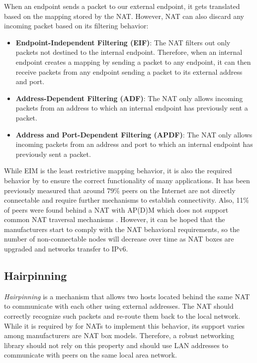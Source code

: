 When an endpoint sends a packet to our external endpoint, it gets translated based on the mapping stored by the NAT. However, NAT can also discard any incoming packet based on its filtering behavior:

\begin{itemize}
    \item \textbf{Endpoint-Independent Filtering (EIF)}: The NAT filters out only packets not destined to the internal endpoint. Therefore, when an internal endpoint creates a mapping by sending a packet to any endpoint, it can then receive packets from any endpoint sending a packet to its external address and port.
    \item \textbf{Address-Dependent Filtering (ADF)}: The NAT only allows incoming packets from an address to which an internal endpoint has previously sent a packet.
    \item \textbf{Address and Port-Dependent Filtering (APDF)}: The NAT only allows incoming packets from an address and port to which an internal endpoint has previously sent a packet.
\end{itemize}

While EIM is the least restrictive mapping behavior, it is also the required behavior by \cite{behave} to ensure the correct functionality of many applications. It has been previously measured that around 79\% peers on the Internet are not directly connectable and require further mechanisms to establish connectivity. Also, 11\% of peers were found behind a NAT with AP(D)M which does not support common NAT traversal mechanisms \cite{nat_wild}. However, it can be hoped that the manufacturers start to comply with the NAT behavioral requirements, so the number of non-connectable nodes will decrease over time as NAT boxes are upgraded and networks transfer to IPv6.


\subsection{Hairpinning}

\textit{Hairpinning} is a  mechanism that allows two hosts located behind the same NAT to communicate with each other using external addresses. The NAT should correctly recognize such packets and re-route them back to the local network. While it is required by \cite{behave} for NATs to implement this behavior, its support varies among manufacturers are NAT box models. Therefore, a robust networking library should not rely on this property and should use LAN addresses to communicate with peers on the same local area network.


